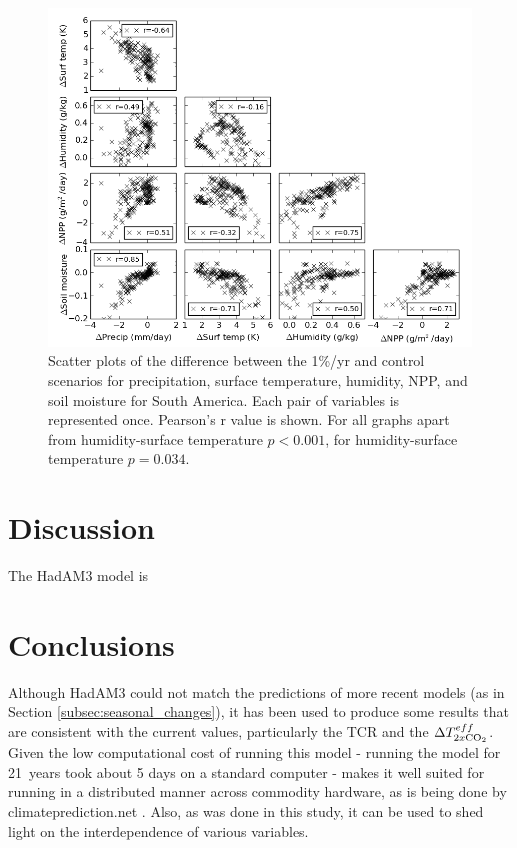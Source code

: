 \documentclass{article}
\begin{document}
\begin{figure}[hbp]
    \centering
    \includegraphics[width=\textwidth]{figures/corr}
    \caption{Scatter plots of the difference between the 1\%/yr and control scenarios for precipitation, surface temperature, humidity, NPP, and soil moisture for South America. Each pair of variables is represented once. Pearson's r value is shown. For all graphs apart from humidity-surface temperature $p < 0.001$, for humidity-surface temperature $p = 0.034$. }
    \label{fig:corr}
\end{figure}

\newpage

\section{Discussion}

The HadAM3 model is 

\section{Conclusions}

Although HadAM3 could not match the predictions of more recent models (as in Section \ref{subsec:seasonal_changes}), it has been used to produce some results that are consistent with the current values, particularly the TCR and the $\Delta T^{eff}_{2x\ce{CO2}}$. Given the low computational cost of running this model - running the model for \SI{21}{years} took about 5 days on a standard computer - makes it well suited for running in a distributed manner across commodity hardware,  as is  being done by climateprediction.net \parencite{stainforth2005uncertainty}. Also, as was done in this study, it can be used to shed light on the interdependence of various variables.
\end{document}
